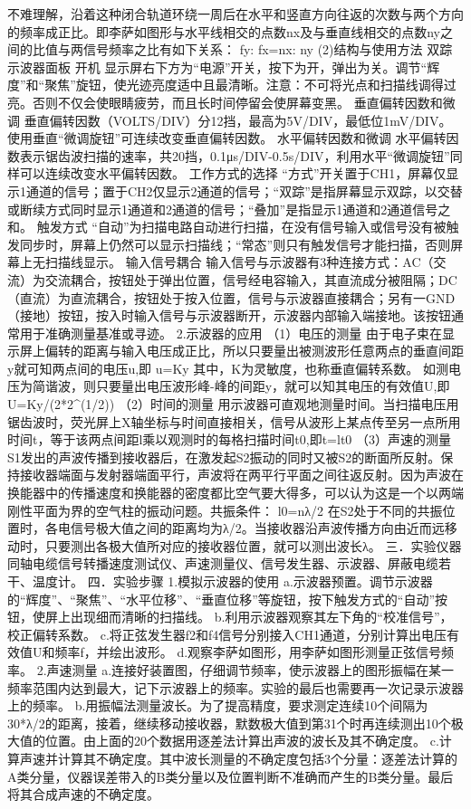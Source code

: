 不难理解，沿着这种闭合轨道环绕一周后在水平和竖直方向往返的次数与两个方向的频率成正比。即李萨如图形与水平线相交的点数nx及与垂直线相交的点数ny之间的比值与两信号频率之比有如下关系：
fy: fx=nx: ny
 (2)结构与使用方法
双踪示波器面板
开机
显示屏右下方为“电源”开关，按下为开，弹出为关。调节“辉度”和“聚焦”旋钮，使光迹亮度适中且最清晰。注意：不可将光点和扫描线调得过亮。否则不仅会使眼睛疲劳，而且长时间停留会使屏幕变黑。
垂直偏转因数和微调
垂直偏转因数（VOLTS/DIV）分12挡，最高为5V/DIV，最低位1mV/DIV。使用垂直“微调旋钮”可连续改变垂直偏转因数。
水平偏转因数和微调
水平偏转因数表示锯齿波扫描的速率，共20挡，0.1μs/DIV-0.5s/DIV，利用水平“微调旋钮”同样可以连续改变水平偏转因数。
工作方式的选择
“方式”开关置于CH1，屏幕仅显示1通道的信号；置于CH2仅显示2通道的信号；“双踪”是指屏幕显示双踪，以交替或断续方式同时显示1通道和2通道的信号；“叠加”是指显示1通道和2通道信号之和。
触发方式
“自动”为扫描电路自动进行扫描，在没有信号输入或信号没有被触发同步时，屏幕上仍然可以显示扫描线；“常态”则只有触发信号才能扫描，否则屏幕上无扫描线显示。
输入信号耦合
输入信号与示波器有3种连接方式：AC（交流）为交流耦合，按钮处于弹出位置，信号经电容输入，其直流成分被阻隔；DC（直流）为直流耦合，按钮处于按入位置，信号与示波器直接耦合；另有一GND（接地）按钮，按入时输入信号与示波器断开，示波器内部输入端接地。该按钮通常用于准确测量基准或寻迹。
2.示波器的应用
（1）电压的测量
由于电子束在显示屏上偏转的距离与输入电压成正比，所以只要量出被测波形任意两点的垂直间距y就可知两点间的电压u,即
u=Ky
其中，K为灵敏度，也称垂直偏转系数。
如测电压为简谐波，则只要量出电压波形峰-峰的间距y，就可以知其电压的有效值U,即    U=Ky/(2*2^(1/2))
（2）时间的测量
用示波器可直观地测量时间。当扫描电压用锯齿波时，荧光屏上X轴坐标与时间直接相关，信号从波形上某点传至另一点所用时间t，等于该两点间距l乘以观测时的每格扫描时间t0,即t=lt0
（3）声速的测量
S1发出的声波传播到接收器后，在激发起S2振动的同时又被S2的断面所反射。保持接收器端面与发射器端面平行，声波将在两平行平面之间往返反射。因为声波在换能器中的传播速度和换能器的密度都比空气要大得多，可以认为这是一个以两端刚性平面为界的空气柱的振动问题。共振条件：
                      l0=nλ/2
在S2处于不同的共振位置时，各电信号极大值之间的距离均为λ/2。当接收器沿声波传播方向由近而远移动时，只要测出各极大值所对应的接收器位置，就可以测出波长λ。
三．实验仪器
同轴电缆信号转播速度测试仪、声速测量仪、信号发生器、示波器、屏蔽电缆若干、温度计。
四．实验步骤
1.模拟示波器的使用
a.示波器预置。调节示波器的“辉度”、“聚焦”、“水平位移”、“垂直位移”等旋钮，按下触发方式的“自动”按钮，使屏上出现细而清晰的扫描线。
b.利用示波器观察其左下角的“校准信号”，校正偏转系数。
c.将正弦发生器f2和f4信号分别接入CH1通道，分别计算出电压有效值U和频率f，并绘出波形。
d.观察李萨如图形，用李萨如图形测量正弦信号频率。
2.声速测量
a.连接好装置图，仔细调节频率，使示波器上的图形振幅在某一频率范围内达到最大，记下示波器上的频率。实验的最后也需要再一次记录示波器上的频率。
b.用振幅法测量波长。为了提高精度，要求测定连续10个间隔为30*λ/2的距离，接着，继续移动接收器，默数极大值到第31个时再连续测出10个极大值的位置。由上面的20个数据用逐差法计算出声波的波长及其不确定度。
c.计算声速并计算其不确定度。其中波长测量的不确定度包括3个分量：逐差法计算的A类分量，仪器误差带入的B类分量以及位置判断不准确而产生的B类分量。最后将其合成声速的不确定度。